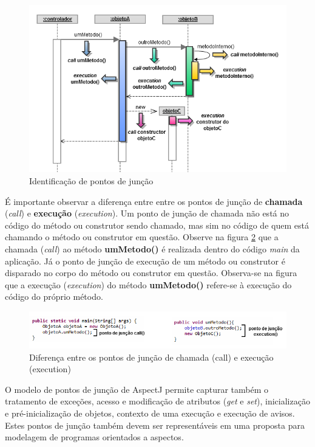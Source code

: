 \begin{figure}[!hb]
	\centering
	\includegraphics{img/aspects_join_point_model.png}
	\caption{Identificação de pontos de junção}\label{fig:aspects_join_point_model}
\end{figure}

É importante observar a diferença entre entre os pontos de junção de \textbf{chamada} (\textit{call}) e \textbf{execução} (\textit{execution}). Um
ponto de junção de chamada não está no código do método ou construtor sendo chamado, mas sim no código de quem está chamando o método ou construtor em
questão. Observe na figura \ref{fig:call_vs_execution} que a chamada (\textit{call}) ao método \textbf{umMetodo()} é realizada dentro do código
\textit{main} da aplicação. Já o ponto de junção de execução de um método ou construtor é disparado no corpo do método ou construtor em questão.
Observa-se na figura que a execução (\textit{execution}) do método \textbf{umMetodo()} refere-se à execução do código do próprio método.

\begin{figure}[!hb]
	\centering
	\includegraphics{img/call_vs_execution.png}
	\caption{Diferença entre os pontos de junção de chamada (call) e execução (execution)}\label{fig:call_vs_execution}
\end{figure}

O modelo de pontos de junção de AspectJ permite capturar também o tratamento de exceções, acesso e modificação de atributos (\textit{get} e
\textit{set}), inicialização e pré-inicialização de objetos, contexto de uma execução e execução de avisos. Estes pontos de junção também devem ser
representáveis em uma proposta para modelagem de programas orientados a aspectos.

